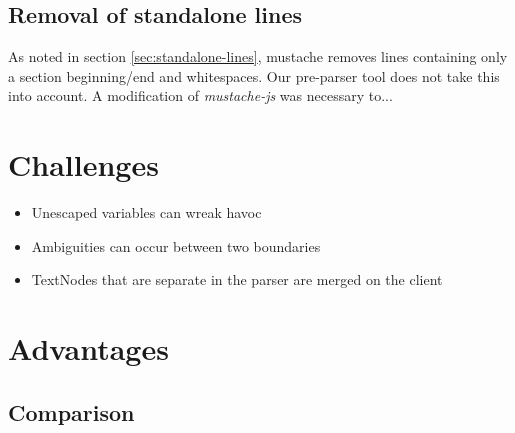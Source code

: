 \documentclass[thesis.tex]{subfiles}
\begin{document}
\subsection{Removal of standalone lines}
As noted in section \ref{sec:standalone-lines}, mustache removes lines
containing only a section beginning/end and whitespaces.
Our pre-parser tool does not take this into account. A modification of
\emph{mustache-js} was necessary to...

\section{Challenges}
\begin{itemize}
\item Unescaped variables can wreak havoc
\item Ambiguities can occur between two boundaries
\item TextNodes that are separate in the parser are merged on the client
\end{itemize}
\section{Advantages}
\subsection{Comparison}
\end{document}
